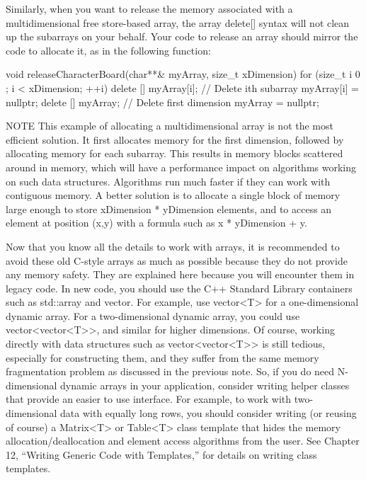Similarly, when you want to release the memory associated with a multidimensional free store-based array, the array delete[] syntax will not clean up the subarrays on your behalf. Your code to release an array should mirror the code to allocate it, as in the following function:

\begin{cpp}
void releaseCharacterBoard(char**& myArray, size_t xDimension)
{
    for (size_t i { 0 }; i < xDimension; ++i) {
        delete [] myArray[i]; // Delete ith subarray
        myArray[i] = nullptr;
    }
    delete [] myArray; // Delete first dimension
    myArray = nullptr;
}
\end{cpp}

\begin{myNotic}{NOTE}
This example of allocating a multidimensional array is not the most efficient solution. It first allocates memory for the first dimension, followed by allocating memory for each subarray. This results in memory blocks scattered around in memory, which will have a performance impact on algorithms working on such data structures. Algorithms run much faster if they can work with contiguous memory. A better solution is to allocate a single block of memory large enough to store xDimension * yDimension elements, and to access an element at position (x,y) with a formula such as x * yDimension + y.
\end{myNotic}

Now that you know all the details to work with arrays, it is recommended to avoid these old C-style arrays as much as possible because they do not provide any memory safety. They are explained here because you will encounter them in legacy code. In new code, you should use the C++ Standard Library containers such as std::array and vector. For example, use vector<T> for a one-dimensional dynamic array. For a two-dimensional dynamic array, you could use vector<vector<T>{}>, and similar for higher dimensions. Of course, working directly with data structures such as vector<vector<T>> is still tedious, especially for constructing them, and they suffer from the same memory fragmentation problem as discussed in the previous note. So, if you do need N-dimensional dynamic arrays in your application, consider writing helper classes that provide an easier to use interface. For example, to work with two-dimensional data with equally long rows, you should consider writing (or reusing of course) a Matrix<T> or Table<T> class template that hides the memory allocation/deallocation and element access algorithms from the user. See Chapter 12, “Writing Generic Code with Templates,” for details on writing class templates.

